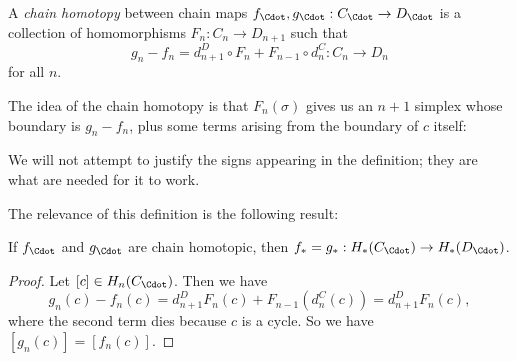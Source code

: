 \documentclass[a4paper]{article}
\theoremstyle{definition}
\begin{document}
\begin{defi}
  A \emph{chain homotopy} between chain maps $f_{\Cdot}, g_{\Cdot}: C_{\Cdot} \to D_{\Cdot}$ is a collection of homomorphisms $F_n: C_n \to D_{n + 1}$ such that
  \[
    g_n - f_n = d_{n + 1}^D \circ F_n + F_{n - 1} \circ d_n^C: C_n \to D_n
  \]
  for all $n$.
\end{defi}
The idea of the chain homotopy is that $F_n(\sigma)$ gives us an $n + 1$ simplex whose boundary is $g_n - f_n$, plus some terms arising from the boundary of $c$ itself:
\begin{center}
\end{center}
We will not attempt to justify the signs appearing in the definition; they are what are needed for it to work.

The relevance of this definition is the following result:
\begin{lemma}
  If $f_{\Cdot}$ and $g_{\Cdot}$ are chain homotopic, then $f_* = g_*: H_*(C_{\Cdot}) \to H_*(D_{\Cdot})$.
\end{lemma}

\begin{proof}
  Let $[c] \in H_n(C_{\Cdot})$. Then we have
  \[
    g_n(c) - f_n(c) = d_{n + 1}^DF_n(c) + F_{n - 1}(d_n^C(c)) = d_{n + 1}^DF_n(c),
  \]
  where the second term dies because $c$ is a cycle. So we have $[g_n(c)] = [f_n(c)]$.
\end{proof}
\end{document}
